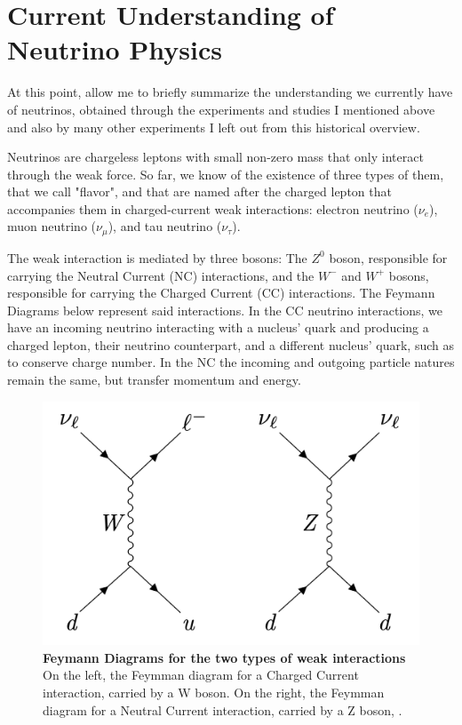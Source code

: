 \section{Current Understanding of Neutrino Physics}

At this point, allow me to briefly summarize the understanding we currently have of neutrinos, obtained through the experiments and studies I mentioned above and also by many other experiments I left out from this historical overview. 

Neutrinos are chargeless leptons with small non-zero mass that only interact through the weak force. So far, we know of the existence of three types of them, that we call "flavor", and that are named after the charged lepton that accompanies them in charged-current weak interactions: electron neutrino ($\nu_e$), muon neutrino ($\nu_{\mu}$), and tau neutrino ($\nu_{\tau}$). 

The weak interaction is mediated by three bosons: The $Z^{0}$ boson, responsible for carrying the Neutral Current (NC) interactions, and the $W^{-}$ and $W^{+}$ bosons, responsible for carrying the Charged Current (CC) interactions. The Feymann Diagrams below represent said interactions. In the CC neutrino interactions, we have an incoming neutrino interacting with a nucleus' quark and producing a charged lepton, their neutrino counterpart, and a different nucleus' quark, such as to conserve charge number. In the NC the incoming and outgoing particle natures remain the same, but transfer momentum and energy. 

\begin{figure}[h!]
	\begin{center}
		\includegraphics[scale=0.3]{Figures/feymann_diag.jpg}
		\caption[Feymann Diagrams for the two types of weak interactions]{ {\textbf{Feymann Diagrams for the two types of weak interactions}} \\ On the left, the Feymman diagram for a Charged Current interaction, carried by a W boson. On the right, the Feymman diagram for a Neutral Current interaction, carried by a Z boson, \cite{Lauren_thesis}.}
		\label{feymann_diag}	
	\end{center}
\end{figure}

